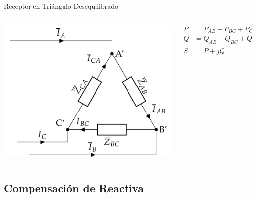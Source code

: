 \documentclass[xcolor={usenames,svgnames,dvipsnames}]{beamer}
\begin{document}
\begin{frame}[label={sec:orgc96d6fe}]{Receptor en Triángulo Desequilibrado}
\begin{columns}
\begin{column}{0.6\columnwidth}
\begin{center}
\includegraphics[width=.9\linewidth]{figs/TrianguloDesequilibrado_Receptor.pdf}
\end{center}
\end{column}

\begin{column}{0.4\columnwidth}
\begin{align*}
  P &= P_{AB} + P_{BC} + P_{CA}\\
  Q &= Q_{AB} + Q_{BC} + Q_{CA}\\
  \overline{S} &= P + jQ
\end{align*}
\end{column}
\end{columns}
\end{frame}


\subsection{Compensación de Reactiva}
\label{sec:orgd8d2538}
\end{document}
